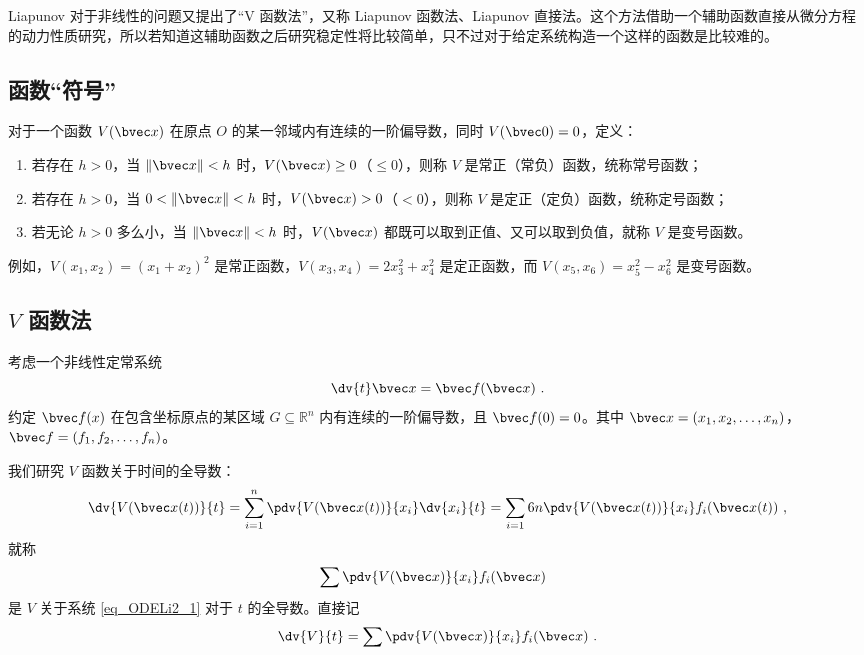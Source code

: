 
Liapunov 对于非线性的问题又提出了“V 函数法”，又称 Liapunov 函数法、Liapunov 直接法。这个方法借助一个辅助函数直接从微分方程的动力性质研究，所以若知道这辅助函数之后研究稳定性将比较简单，只不过对于给定系统构造一个这样的函数是比较难的。



\subsection{函数“符号”}
\begin{definition}{}
对于一个函数 $ V(\bvec x)$ 在原点 $O$ 的某一邻域内有连续的一阶偏导数，同时 $ V(\bvec 0 ) = 0$，定义：
\begin{enumerate}
\item 若存在 $h>0$，当 $\Vert \bvec x \Vert < h$ 时，$V(\bvec x) \ge 0$（$\le 0$），则称 $V$ 是常正（常负）函数，统称常号函数；
\item 若存在 $h > 0$，当 $0 < \Vert \bvec x \Vert < h$ 时，$V(\bvec x) > 0$（$< 0$），则称 $V$ 是定正（定负）函数，统称定号函数；
\item 若无论 $h > 0$ 多么小，当 $\Vert \bvec x \Vert < h$ 时，$V(\bvec x)$ 都既可以取到正值、又可以取到负值，就称 $V$ 是变号函数。
\end{enumerate}

\end{definition}

例如，$V(x_1, x_2) = (x_1 + x_2)^2$ 是常正函数，$V(x_3, x_4) = 2 x_3^2 + x_4^2$ 是定正函数，而 $V(x_5, x_6) = x_5^2 - x_6^2$ 是变号函数。

\subsection{$V$ 函数法}
考虑一个非线性定常系统 
\begin{equation}\label{eq_ODELi2_1}
\dv{t} \bvec x = \bvec f(\bvec x) ~.
\end{equation}
约定 $\bvec f(x)$ 在包含坐标原点的某区域 $G \subseteq \mathbb R^n$ 内有连续的一阶偏导数，且 $\bvec f(0) = 0$。其中 $\bvec x = (x_1, x_2, \dots, x_n)$，$\bvec f = (f_1, f_2, \dots, f_n)$。

我们研究 $V$ 函数关于时间的全导数：
\begin{equation}
\dv{V(\bvec x(t))}{t} = \sum_{i=1}^n \pdv{V(\bvec x(t))}{x_i} \dv{x_i}{t} = \sum_{i=1}6n \pdv{V(\bvec x(t))}{x_i} f_i(\bvec x(t)) ~,
\end{equation}
就称 
\begin{equation}
\sum \pdv{V(\bvec x)}{x_i} f_i(\bvec x) ~~
\end{equation}
是 $V$ 关于系统 \autoref{eq_ODELi2_1} 对于 $t$ 的全导数。直接记
\begin{equation}
\dv{V}{t} = \sum \pdv{V(\bvec x)}{x_i} f_i(\bvec x) ~.
\end{equation}


